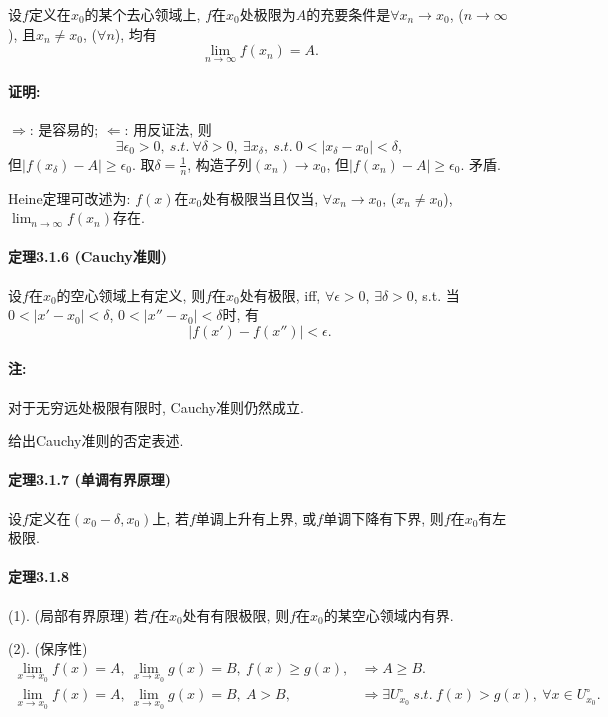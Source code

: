 设$f$定义在$x_{0}$的某个去心领域上, $f$在$x_{0}$处极限为$A$的充要条件是$\forall x_{n}\to x_{0}$,
($n\to\infty$), 且$x_{n}\ne x_{0}$, ($\forall n$), 均有
\[
\lim_{n\to\infty}f(x_{n})=A.
\]


\paragraph{证明:}

$\Longrightarrow$: 是容易的; $\Longleftarrow$: 用反证法, 则
\[
\exists\epsilon_{0}>0,\ s.t.\ \forall\delta>0,\ \exists x_{\delta},\ s.t.\ 0<\left|x_{\delta}-x_{0}\right|<\delta,
\]
但$\left|f(x_{\delta})-A\right|\ge\epsilon_{0}$. 取$\delta=\frac{1}{n}$,
构造子列$(x_{n})\to x_{0}$, 但$\left|f(x_{n})-A\right|\ge\epsilon_{0}$.
矛盾.

Heine定理可改述为: $f(x)$在$x_{0}$处有极限当且仅当, $\forall x_{n}\to x_{0}$,
($x_{n}\ne x_{0}$), $\lim_{n\to\infty}f(x_{n})$存在.

\paragraph{定理3.1.6 (Cauchy准则)}

设$f$在$x_{0}$的空心领域上有定义, 则$f$在$x_{0}$处有极限, iff, $\forall\epsilon>0$,
$\exists\delta>0$, s.t. 当$0<\left|x'-x_{0}\right|<\delta$, $0<\left|x''-x_{0}\right|<\delta$时,
有
\[
\left|f(x')-f(x'')\right|<\epsilon.
\]


\paragraph{注:}

对于无穷远处极限有限时, Cauchy准则仍然成立.

给出Cauchy准则的否定表述.

\paragraph{定理3.1.7 (单调有界原理)}

设$f$定义在$(x_{0}-\delta,x_{0})$上, 若$f$单调上升有上界, 或$f$单调下降有下界, 则$f$在$x_{0}$有左极限.

\paragraph{定理3.1.8}

(1). (局部有界原理) 若$f$在$x_{0}$处有有限极限, 则$f$在$x_{0}$的某空心领域内有界.

(2). (保序性) 
\begin{align*}
	\lim_{x\to x_{0}}f(x)=A,\ \lim_{x\to x_{0}}g(x)=B,\ f(x)\ge g(x), & \Longrightarrow A\ge B.\\
	\lim_{x\to x_{0}}f(x)=A,\ \lim_{x\to x_{0}}g(x)=B,\ A>B, & \Longrightarrow\exists U_{x_{0}}^{\circ}\ s.t.\ f(x)>g(x),\ \forall x\in U_{x_{0}}^{\circ}.
\end{align*}

